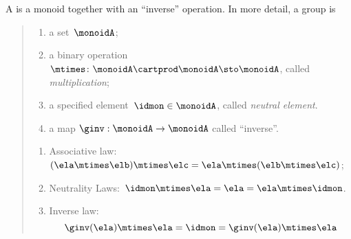 

\section{}\label{sec:groups}


\begin{definition}[Group]
  \label{def:group}
  A \emph{} is a monoid together with an ``inverse'' operation.
  In more detail, a group is
  \begin{quote}
    \constit
    \begin{enumerate}
      \item a set~$\monoidA$;
      \item a binary operation~$\mtimes \colon \monoidA \cartprod \monoidA \sto \monoidA$, called \emph{multiplication};
      \item a specified element~$\idmon\in \monoidA$, called \emph{neutral element}.
      \item a map $\ginv: \monoidA \to \monoidA$ called ``inverse''.
    \end{enumerate}
    \condit
    \begin{enumerate}
      \item Associative law:~$(\ela\mtimes \elb)\mtimes \elc=\ela\mtimes (\elb\mtimes \elc)$;
      \item Neutrality Laws:~$\idmon\mtimes \ela=\ela=\ela \mtimes \idmon$.
      \item Inverse law:
      \begin{equation}
        \ginv(\ela) \mtimes \ela = \idmon = \ginv(\ela) \mtimes \ela
      \end{equation}
    \end{enumerate}
  \end{quote}
\end{definition}


